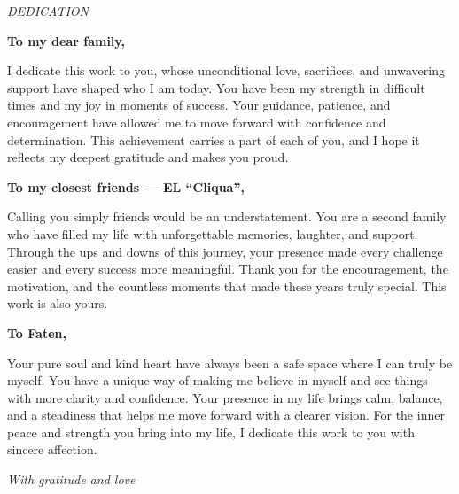 \cleardoublepage
\thispagestyle{empty}

\begin{center}

{\Large\textit{DEDICATION}}

\vspace{1cm}

\textbf{To my dear family,}

\vspace{0.3cm}

I dedicate this work to you, whose unconditional love, sacrifices, and unwavering support have shaped who I am today.
You have been my strength in difficult times and my joy in moments of success.
Your guidance, patience, and encouragement have allowed me to move forward with confidence and determination.
This achievement carries a part of each of you, and I hope it reflects my deepest gratitude and makes you proud.
\vspace{0.6cm}

\textbf{To my closest friends --- EL ``Cliqua'',}

\vspace{0.3cm}

Calling you simply friends would be an understatement.  
You are a second family who have filled my life with unforgettable memories, laughter, and support.  
Through the ups and downs of this journey, your presence made every challenge easier and every success more meaningful.  
Thank you for the encouragement, the motivation, and the countless moments that made these years truly special.  
This work is also yours.

\vspace{0.6cm}

\textbf{To Faten,}

\vspace{0.3cm}

Your pure soul and kind heart have always been a safe space where I can truly be myself.  
You have a unique way of making me believe in myself and see things with more clarity and confidence.  
Your presence in my life brings calm, balance, and a steadiness that helps me move forward with a clearer vision.  
For the inner peace and strength you bring into my life, I dedicate this work to you with sincere affection.

\vspace{0.8cm}

\textit{With gratitude and love}

\end{center}

\cleardoublepage